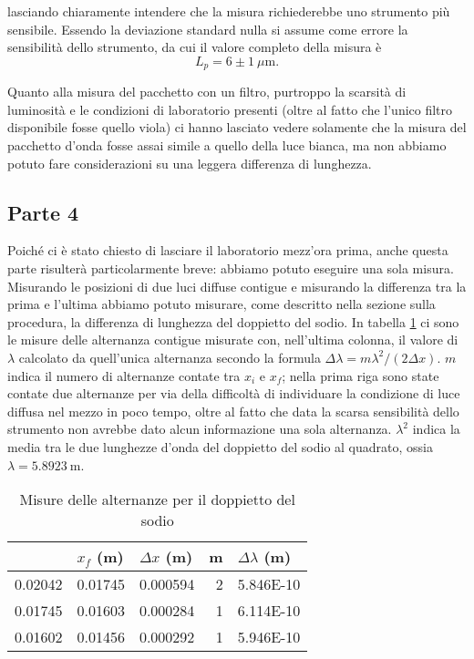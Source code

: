 \documentclass[a4paper,11pt]{article}
\begin{document}
	lasciando chiaramente intendere che la misura richiederebbe uno strumento più sensibile. Essendo la deviazione standard nulla si assume come errore la sensibilità dello strumento, da cui il valore completo della misura è $$L _p = 6 \pm 1 \ \mu \text{m}.$$

	Quanto alla misura del pacchetto con un filtro, purtroppo la scarsità di luminosità e le condizioni di laboratorio presenti (oltre al fatto che l'unico filtro disponibile fosse quello viola) ci hanno lasciato vedere solamente che la misura del pacchetto d'onda fosse assai simile a quello della luce bianca, ma non abbiamo potuto fare considerazioni su una leggera differenza di lunghezza.

	\subsection{Parte 4}
	
	Poiché ci è stato chiesto di lasciare il laboratorio mezz'ora prima, anche questa parte risulterà particolarmente breve: abbiamo potuto eseguire una sola misura. Misurando le posizioni di due luci diffuse contigue e misurando la differenza tra la prima e l'ultima abbiamo potuto misurare, come descritto nella sezione sulla procedura, la differenza di lunghezza del doppietto del sodio. In tabella \ref{alternanze} ci sono le misure delle alternanza contigue misurate con, nell'ultima colonna, il valore di $\lambda$ calcolato da quell'unica alternanza secondo la formula $\Delta \lambda = m \lambda ^2 / (2 \Delta x)$. $m$ indica il numero di alternanze contate tra $x _i$ e $x_f$; nella prima riga sono state contate due alternanze per via della difficoltà di individuare la condizione di luce diffusa nel mezzo in poco tempo, oltre al fatto che data la scarsa sensibilità dello strumento non avrebbe dato alcun informazione una sola alternanza. $\lambda ^2$ indica la media tra le due lunghezze d'onda del doppietto del sodio al quadrato, ossia $\lambda = \SI{5.8923}{\meter}$.

\begin{table}[htbp]
  \centering
  \caption{Misure delle alternanze per il doppietto del sodio}
    \begin{tabular}{rrrrr}
    \bottomrule
    \rowcolor[rgb]{ .267,  .447,  .769} \multicolumn{1}{l}{\textcolor[rgb]{ 1,  1,  1}{\textbf{$x _i$ (m)}}} & \multicolumn{1}{l}{\textcolor[rgb]{ 1,  1,  1}{\textbf{$x _f$ (m)}}} & \multicolumn{1}{l}{\textcolor[rgb]{ 1,  1,  1}{\textbf{$\Delta x$ (m)}}} & \multicolumn{1}{l}{\textcolor[rgb]{ 1,  1,  1}{\textbf{m}}} & \multicolumn{1}{l}{\textcolor[rgb]{ 1,  1,  1}{\textbf{$\Delta \lambda$ (m)}}} \\
    \toprule
    \rowcolor[rgb]{ .851,  .851,  .851} 0.02042 & 0.01745 & 0.000594 & 2     & 5.846E-10 \\
    0.01745 & 0.01603 & 0.000284 & 1     & 6.114E-10 \\
    \rowcolor[rgb]{ .851,  .851,  .851} 0.01602 & 0.01456 & 0.000292 & 1     & 5.946E-10 \\
    \toprule
    \end{tabular}%
  \label{alternanze}%
\end{table}%
\end{document}

